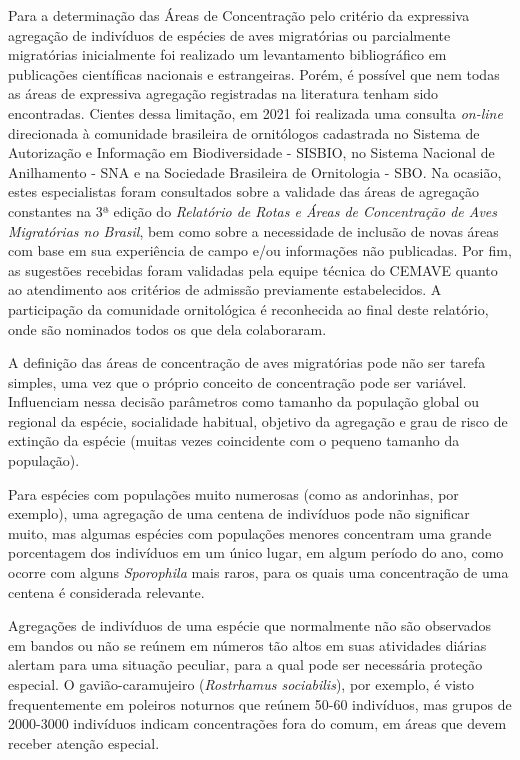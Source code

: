 \documentclass[
  oneside]{scrbook}
\begin{document}
Para a determinação das Áreas de Concentração pelo critério da expressiva agregação de indivíduos de espécies de aves migratórias ou parcialmente migratórias inicialmente foi realizado um levantamento bibliográfico em publicações científicas nacionais e estrangeiras. Porém, é possível que nem todas as áreas de expressiva agregação registradas na literatura tenham sido encontradas. Cientes dessa limitação, em 2021 foi realizada uma consulta \emph{on-line} direcionada à comunidade brasileira de ornitólogos cadastrada no Sistema de Autorização e Informação em Biodiversidade - SISBIO, no Sistema Nacional de Anilhamento - SNA e na Sociedade Brasileira de Ornitologia - SBO. Na ocasião, estes especialistas foram consultados sobre a validade das áreas de agregação constantes na 3ª edição do \emph{Relatório de Rotas e Áreas de Concentração de Aves Migratórias no Brasil}, bem como sobre a necessidade de inclusão de novas áreas com base em sua experiência de campo e/ou informações não publicadas. Por fim, as sugestões recebidas foram validadas pela equipe técnica do CEMAVE quanto ao atendimento aos critérios de admissão previamente estabelecidos. A participação da comunidade ornitológica é reconhecida ao final deste relatório, onde são nominados todos os que dela colaboraram.

A definição das áreas de concentração de aves migratórias pode não ser tarefa simples, uma vez que o próprio conceito de concentração pode ser variável. Influenciam nessa decisão parâmetros como tamanho da população global ou regional da espécie, socialidade habitual, objetivo da agregação e grau de risco de extinção da espécie (muitas vezes coincidente com o pequeno tamanho da população).

Para espécies com populações muito numerosas (como as andorinhas, por exemplo), uma agregação de uma centena de indivíduos pode não significar muito, mas algumas espécies com populações menores concentram uma grande porcentagem dos indivíduos em um único lugar, em algum período do ano, como ocorre com alguns \emph{Sporophila} mais raros, para os quais uma concentração de uma centena é considerada relevante.

Agregações de indivíduos de uma espécie que normalmente não são observados em bandos ou não se reúnem em números tão altos em suas atividades diárias alertam para uma situação peculiar, para a qual pode ser necessária proteção especial. O gavião-caramujeiro (\emph{Rostrhamus sociabilis}), por exemplo, é visto frequentemente em poleiros noturnos que reúnem 50-60 indivíduos, mas grupos de 2000-3000 indivíduos indicam concentrações fora do comum, em áreas que devem receber atenção especial.
\end{document}
